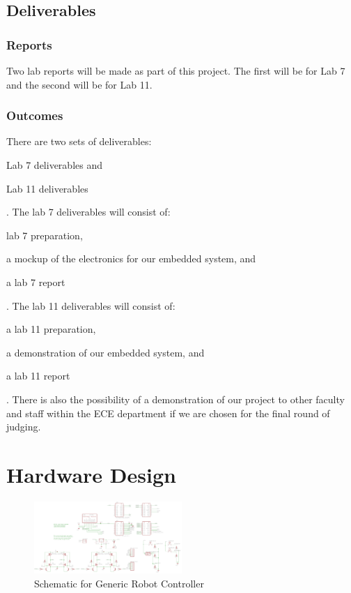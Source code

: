 \documentclass{article}
\begin{document}
	\subsection{Deliverables}

		\subsubsection{Reports}
			Two lab reports will be made as part of this project. The first will be for Lab 7 and the second will be for Lab 11.
		\subsubsection{Outcomes}
			There are two sets of deliverables:
			\begin{inlinelist}
				\item Lab 7 deliverables and
				\item Lab 11 deliverables
			\end{inlinelist}.
			The lab 7 deliverables will consist of:
			\begin{inlinelist}
				\item lab 7 preparation,
				\item a mockup of the electronics for our embedded system, and
				\item a lab 7 report
			\end{inlinelist}.
			The lab 11 deliverables will consist of:
			\begin{inlinelist}
				\item a lab 11 preparation,
				\item a demonstration of our embedded system, and
				\item a lab 11 report
			\end{inlinelist}. There is also the possibility of a demonstration of our project to other faculty and staff within the ECE department if we are chosen for the final round of judging.

\section{Hardware Design}

	\begin{figure}[h]
		\includegraphics[keepaspectratio, angle = 90, width=0.5\textwidth]{Lab7Graphics/Schematic.png}
		\caption{Schematic for Generic Robot Controller}
		\label{fig:schematic}
	\end{figure}
	
\end{document}
